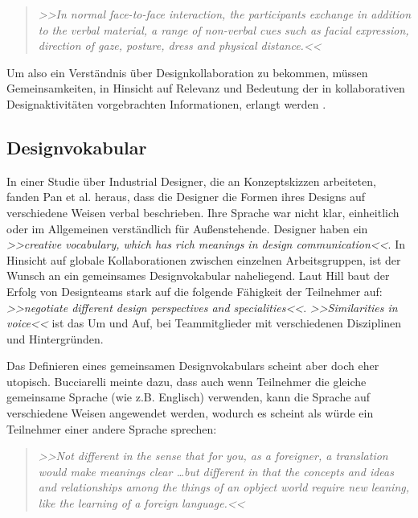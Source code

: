 \begin{quote}
	\textsl{>>In normal face-to-face interaction, the participants exchange in addition to the verbal material, a range of non-verbal cues such as facial expression, direction of gaze, posture, dress and physical distance.<<}
\begin{flushright}\citep{Short:1991}\end{flushright}
\end{quote}

Um also ein Verständnis über Designkollaboration zu bekommen, müssen Gemeinsamkeiten, in Hinsicht auf Relevanz und Bedeutung der in kollaborativen Designaktivitäten vorgebrachten Informationen, erlangt werden \citep{Hill:2001}.

\subsection{Designvokabular}
In einer Studie über Industrial Designer, die an Konzeptskizzen arbeiteten, fanden Pan et al. \citep{Pan:2002} heraus, dass die Designer die Formen ihres Designs auf verschiedene Weisen verbal beschrieben. Ihre Sprache war nicht klar, einheitlich oder im Allgemeinen verständlich für Außenstehende. Designer haben ein \emph{>>creative vocabulary, which has rich meanings in design communication<<}\citep{Pan:2002}. In Hinsicht auf globale Kollaborationen zwischen einzelnen Arbeitsgruppen, ist der Wunsch an ein gemeinsames Designvokabular naheliegend. Laut Hill \citep{Hill:2001} baut der Erfolg von Designteams stark auf die folgende Fähigkeit der Teilnehmer auf: \emph{>>negotiate different design perspectives and specialities<<}. \emph{>>Similarities in voice<<} ist das Um und Auf, bei Teammitglieder mit verschiedenen Disziplinen und Hintergründen.

\medskip Das Definieren eines gemeinsamen Designvokabulars scheint aber doch eher utopisch. Bucciarelli meinte dazu, dass auch wenn Teilnehmer die gleiche gemeinsame Sprache (wie z.B. Englisch) verwenden, kann die Sprache auf verschiedene Weisen angewendet werden, wodurch es scheint als würde ein Teilnehmer einer andere Sprache sprechen:

\begin{quote}
	\textsl{>>Not different in the sense that for you, as a foreigner, a translation would make meanings clear \ldots but different in that the concepts and ideas and relationships among the things of an opbject world require new leaning, like the learning of a foreign language.<<}
\begin{flushright}\citep{Bucciarelli:2002}\end{flushright}
\end{quote}

